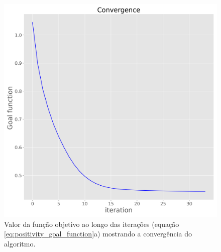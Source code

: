 \begin{figure}
	\centering
	\includegraphics[width=.9\textwidth]{Fig/eqlayer/unidir_shallow_diff_test/convergence_LM_NNLS_magRM.png}
	\caption{Valor da função objetivo ao longo das iterações (equação \ref{eq:positivity_goal_function}a) mostrando a convergência do algoritmo.}
	\label{fig:convergence_3}
\end{figure}

